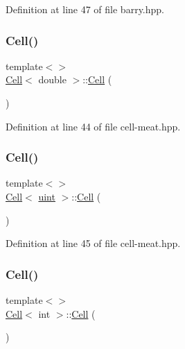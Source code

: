 Definition at line 47 of file barry.\+hpp.

\mbox{\label{class_cell_a5ecdaddaf4661a9a8fe6f0ed61595847}} 
\subsubsection{\texorpdfstring{Cell()}{Cell()}\hspace{0.1cm}{\footnotesize\ttfamily [10/13]}}
{\footnotesize\ttfamily template$<$$>$ \\
\hyperlink{class_cell}{Cell}$<$ double $>$\+::\hyperlink{class_cell}{Cell} (\begin{DoxyParamCaption}{ }\end{DoxyParamCaption})\hspace{0.3cm}{\ttfamily [inline]}}



Definition at line 44 of file cell-\/meat.\+hpp.

\mbox{\label{class_cell_aa102374546b7479f50a8eeec80ec2764}} 
\subsubsection{\texorpdfstring{Cell()}{Cell()}\hspace{0.1cm}{\footnotesize\ttfamily [11/13]}}
{\footnotesize\ttfamily template$<$$>$ \\
\hyperlink{class_cell}{Cell}$<$ \hyperlink{typedefs_8hpp_a91ad9478d81a7aaf2593e8d9c3d06a14}{uint} $>$\+::\hyperlink{class_cell}{Cell} (\begin{DoxyParamCaption}{ }\end{DoxyParamCaption})\hspace{0.3cm}{\ttfamily [inline]}}



Definition at line 45 of file cell-\/meat.\+hpp.

\mbox{\label{class_cell_a7019dc2ccc1e14bd17aa9f03b377a199}} 
\subsubsection{\texorpdfstring{Cell()}{Cell()}\hspace{0.1cm}{\footnotesize\ttfamily [12/13]}}
{\footnotesize\ttfamily template$<$$>$ \\
\hyperlink{class_cell}{Cell}$<$ int $>$\+::\hyperlink{class_cell}{Cell} (\begin{DoxyParamCaption}{ }\end{DoxyParamCaption})\hspace{0.3cm}{\ttfamily [inline]}}



